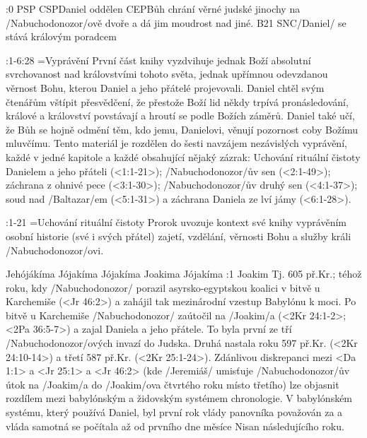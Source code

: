 

%



:0 {} 
% 
        {PSP}{}%
        {CSP}{Daniel oddělen}%
        {CEP}{Bůh chrání věrné judské jinochy na \x/Nabuchodonozor/ově dvoře a dá jim moudrost nad jiné.}%
        {B21}{}%
        {SNC}{\x/Daniel/ se stává královým poradcem} 
             

:1-6:28 {}={Vyprávění}  První část knihy vyzdvihuje jednak Boží absolutní svrchovanost nad královstvími tohoto světa, jednak upřímnou odevzdanou věrnost Bohu, kterou Daniel a jeho přátelé projevovali. 
Daniel chtěl svým čtenářům vštípit přesvědčení, že přestože Boží lid někdy trpívá pronásledování, králové a království povstávají a hroutí se podle Božích záměrů. Daniel také učí, že Bůh se hojně odmění těm, kdo jemu, Danielovi, věnují pozornost coby Božímu mluvčímu. Tento materiál je rozdělen do šesti navzájem nezávislých vyprávění, každé v jedné kapitole a každé obsahující nějaký zázrak:
Uchování rituální čistoty Danielem a jeho přáteli (<1:1-21>); \x/Nabuchodonozor/ův sen (<2:1-49>); záchrana z ohnivé pece (<3:1-30>); \x/Nabuchodonozor/ův druhý sen (<4:1-37>); soud nad \x/Baltazar/em (<5:1-31>) a záchrana Daniela ze lví jámy (<6:1-28>).

:1-21 {}={Uchování rituální čistoty}  Prorok uvozuje kontext své knihy vyprávěním osobní historie (své i svých přátel) zajetí, vzdělání, věrnosti Bohu a služby králi \x/Nabuchodonozor/ovi.

    {Jehójákíma} %
    {Jójakíma}  %
    {Jójakíma} %
    {Joakima}  %
    {Jójakíma}  %
:1 {Joakim}  Tj. 605 př.Kr.; téhož roku, kdy \x/Nabuchodonozor/ porazil  asyrsko-egyptskou koalici v bitvě u Karchemiše (<Jr 46:2>) a zahájil tak mezinárodní vzestup Babylónu k moci. Po bitvě u Karchemiše \x/Nabuchodonozor/ zaútočil na \x/Joakim/a (<2Kr 24:1-2>; <2Pa 36:5-7>) a zajal Daniela a jeho přátele. 
To byla první ze tří \x/Nabuchodonozor/ových  invazí do Judska. Druhá nastala roku 597 př.Kr. (<2Kr 24:10-14>) a třetí 587 př.Kr. (<2Kr 25:1-24>). Zdánlivou diskrepanci mezi <Da 1:1> a <Jr 25:1> a <Jr 46:2> (kde \x/Jeremiáš/ umisťuje \x/Nabuchodonozor/ův útok na \x/Joakim/a do \x/Joakim/ova čtvrtého roku místo třetího) lze objasnit rozdílem mezi babylónským a židovským systémem chronologie. V babylónském systému, který používá Daniel, byl první rok vlády panovníka považován za  a vláda samotná se počítala až od prvního dne měsíce Nisan následujícího roku.

